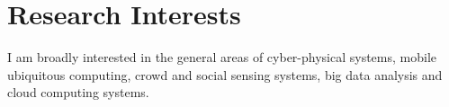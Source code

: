 \section{\sc Research Interests}

I am broadly interested in the general areas of cyber-physical systems, mobile ubiquitous computing, crowd and social sensing systems, big data analysis and cloud computing systems.



